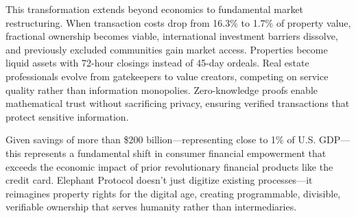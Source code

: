 This transformation extends beyond economics to fundamental market restructuring. When transaction costs drop from 16.3\% to 1.7\% of property value, fractional ownership becomes viable, international investment barriers dissolve, and previously excluded communities gain market access. Properties become liquid assets with 72-hour closings instead of 45-day ordeals. Real estate professionals evolve from gatekeepers to value creators, competing on service quality rather than information monopolies. Zero-knowledge proofs enable mathematical trust without sacrificing privacy, ensuring verified transactions that protect sensitive information.

Given savings of more than \$200 billion---representing close to 1\% of U.S. GDP---this represents a fundamental shift in consumer financial empowerment that exceeds the economic impact of prior revolutionary financial products like the credit card. Elephant Protocol doesn't just digitize existing processes---it reimagines property rights for the digital age, creating programmable, divisible, verifiable ownership that serves humanity rather than intermediaries.